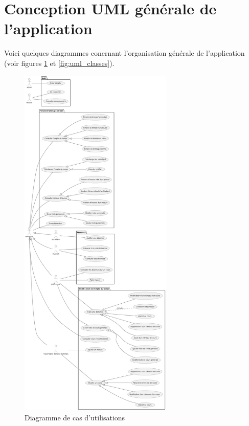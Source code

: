 \documentclass[a4paper,12pt]{article}
\begin{document}
\section{Conception UML générale de l’application}
Voici quelques diagrammes conernant l'organisation générale de l'application (voir figures \ref{fig:uml_uc} et \ref{fig:uml_classes}).\\
\begin{figure}[!ht]
    \centering
    \includegraphics[width=0.65\textwidth]{UC.png}
    \caption{Diagramme de cas d'utilisations}
    \label{fig:uml_uc}
\end{figure}
\end{document}
